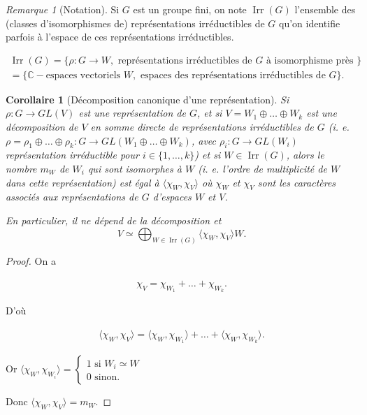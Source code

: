 \documentclass[french]{book}
\newtheorem{protocorollary}{Corollaire}
\newenvironment{corollary}
    {\colorlet{shadecolor}{violet!10}\begin{shaded}\begin{protocorollary}}
    {\end{protocorollary}\end{shaded}}
\theoremstyle{definition}
\theoremstyle{remark}
\newtheorem*{remark}{Remarque}
\begin{document}
\begin{remark}[Notation]
  Si \(G\) est un groupe fini, on note \(\operatorname{Irr}(G)\) l'ensemble des (classes d'isomorphismes de) représentations irréductibles de \(G\) qu'on identifie parfois à l'espace de ces représentations irréductibles.

  \begin{gather*}
    \operatorname{Irr}(G) = \{ \rho : G \longrightarrow W, \text{ représentations irréductibles de } G \text{ à isomorphisme près } \}\\
     = \{ \mathbb{C}-\text{espaces vectoriels } W, \text{ espaces des représentations irréductibles de } G \}.
  \end{gather*}
\end{remark}

\begin{corollary}[Décomposition canonique d'une représentation]\label{cor2}
  Si \(\rho : G \longrightarrow GL(V)\) est une représentation de \(G\), et si \(V = W_1 \oplus \dots \oplus W_k\) est une décomposition de \(V\) en somme directe de représentations irréductibles de \(G\) (i. e. \(\rho = \rho_1 \oplus \dots \oplus \rho_k : G \longrightarrow GL(W_1 \oplus \dots \oplus W_k)\), avec \(\rho_i : G \longrightarrow GL(W_i)\) représentation irréductible pour \(i \in \{ 1, \dots, k \}\)) et si \(W \in \operatorname{Irr}(G)\), alors le nombre \(m_W\) de \(W_i\) qui sont isomorphes à \(W\) (i. e. l'ordre de multiplicité de \(W\) dans cette représentation) est égal à \(\langle \chi_W, \chi_V \rangle \) où \(\chi_W\) et \(\chi_V\) sont les caractères associés aux représentations de \(G\) d'espaces \(W\) et \(V\).

  En particulier, il ne dépend de la décomposition et \[V \simeq \bigoplus _{W \in \operatorname{Irr}(G)} \langle \chi_W, \chi_V \rangle W.\]
\end{corollary}

\begin{proof}
  On a

  \begin{gather*}
    \chi_V = \chi _{W_1} + \dots + \chi _{W_k}.
  \end{gather*}

  D'où

  \begin{gather*}
    \langle \chi _{W}, \chi_V \rangle = \langle \chi_W, \chi _{W_1} \rangle + \dots + \langle \chi_W, \chi _{W_k} \rangle.
  \end{gather*}

  Or \(\langle \chi_W, \chi _{W_i} \rangle = \begin{cases}
    1 \text{ si } W_i \simeq W \\
    0 \text{ sinon. }
  \end{cases} \)

  Donc \(\langle \chi_W, \chi_V \rangle = m_W\).
\end{proof}
\end{document}
